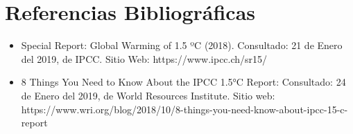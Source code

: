 \documentclass{article}
\begin{document}

\section{Referencias Bibliográficas}
\begin{itemize}
    \item Special Report: Global Warming of 1.5 ºC (2018). Consultado: 21 de Enero del 2019, de IPCC. Sitio Web: https://www.ipcc.ch/sr15/
    \item 8 Things You Need to Know About the IPCC 1.5°C Report: Consultado: 24 de Enero del 2019, de World Resources Institute. Sitio web: https://www.wri.org/blog/2018/10/8-things-you-need-know-about-ipcc-15-c-report
\end{itemize}
\end{document}
